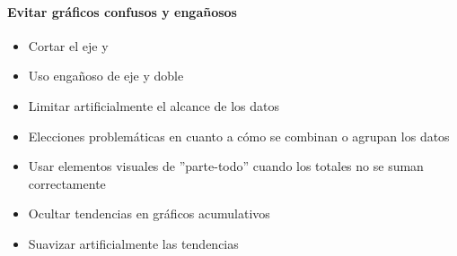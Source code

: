 


\paragraph{Evitar gráficos confusos y engañosos}
\begin{itemize}
    \item {Cortar el eje y}
    \item {Uso engañoso de eje y doble}
    \item {Limitar artificialmente el alcance de los datos}
    \item {Elecciones problemáticas en cuanto a cómo se combinan o agrupan los datos}
    \item {Usar elementos visuales de ''parte-todo'' cuando los totales no se suman correctamente}
    \item {Ocultar tendencias en gráficos acumulativos}
    \item {Suavizar artificialmente las tendencias}
    
\end{itemize}

\newpage